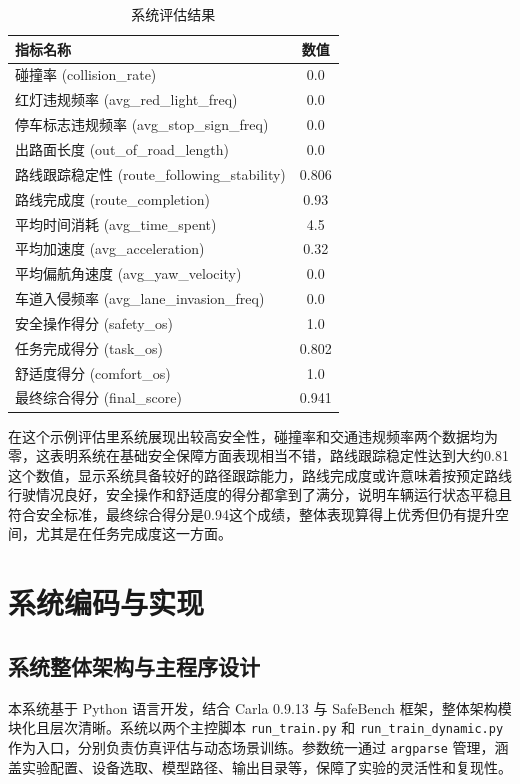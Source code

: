\begin{table}[H]
	\centering
	\caption{系统评估结果}
	\label{tab:evaluation_results}
	\begin{tabular}{lc}
		\toprule
		指标名称 & 数值 \\
		\midrule
		碰撞率 (collision\_rate) & 0.0 \\
		红灯违规频率 (avg\_red\_light\_freq) & 0.0 \\
		停车标志违规频率 (avg\_stop\_sign\_freq) & 0.0 \\
		出路面长度 (out\_of\_road\_length) & 0.0 \\
		路线跟踪稳定性 (route\_following\_stability) & 0.806 \\
		路线完成度 (route\_completion) & 0.93 \\
		平均时间消耗 (avg\_time\_spent) & 4.5 \\
		平均加速度 (avg\_acceleration) & 0.32 \\
		平均偏航角速度 (avg\_yaw\_velocity) & 0.0 \\
		车道入侵频率 (avg\_lane\_invasion\_freq) & 0.0 \\
		安全操作得分 (safety\_os) & 1.0 \\
		任务完成得分 (task\_os) & 0.802 \\
		舒适度得分 (comfort\_os) & 1.0 \\
		最终综合得分 (final\_score) & 0.941 \\
		\bottomrule
	\end{tabular}
\end{table}

在这个示例评估里系统展现出较高安全性，碰撞率和交通违规频率两个数据均为零，这表明系统在基础安全保障方面表现相当不错，路线跟踪稳定性达到大约0.81这个数值，显示系统具备较好的路径跟踪能力，路线完成度或许意味着按预定路线行驶情况良好，安全操作和舒适度的得分都拿到了满分，说明车辆运行状态平稳且符合安全标准，最终综合得分是0.94这个成绩，整体表现算得上优秀但仍有提升空间，尤其是在任务完成度这一方面。




\section{系统编码与实现}

\subsection{系统整体架构与主程序设计}

本系统基于 Python 语言开发，结合 Carla 0.9.13 与 SafeBench 框架，整体架构模块化且层次清晰。系统以两个主控脚本 \texttt{run\_train.py} 和 \texttt{run\_train\_dynamic.py} 作为入口，分别负责仿真评估与动态场景训练。参数统一通过 \texttt{argparse} 管理，涵盖实验配置、设备选取、模型路径、输出目录等，保障了实验的灵活性和复现性。

